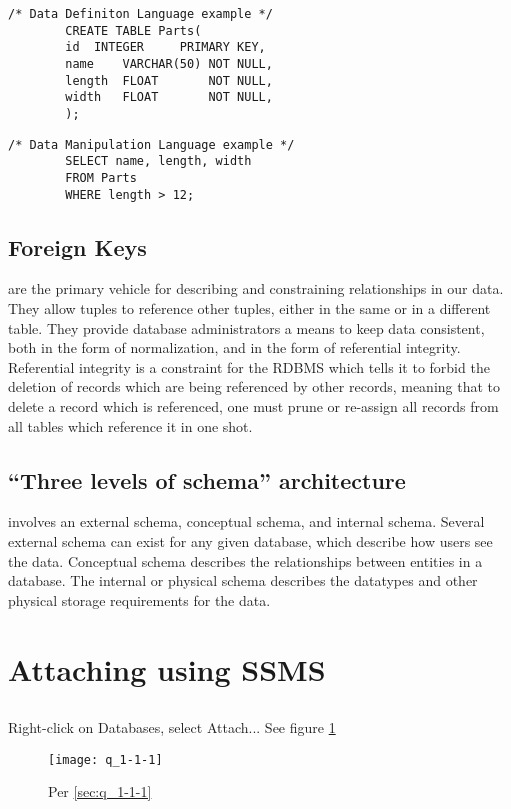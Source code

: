 \documentclass{article}
\begin{document}
		\begin{lstlisting}[float]
		/* Data Definiton Language example */
		CREATE TABLE Parts(
		id	INTEGER     PRIMARY KEY,
		name	VARCHAR(50) NOT NULL,
		length	FLOAT       NOT NULL,
		width	FLOAT       NOT NULL,
		);
		\end{lstlisting}

		\begin{lstlisting}[float]
		/* Data Manipulation Language example */
		SELECT name, length, width
		FROM Parts
		WHERE length > 12;
		\end{lstlisting}

	\subsection{Foreign Keys} are the primary vehicle for describing and
	constraining relationships in our data. They allow tuples to reference
	other tuples, either in the same or in a different table. They provide
	database administrators a means to keep data consistent, both in the
	form of normalization, and in the form of referential integrity.
	Referential integrity is a constraint for the RDBMS which tells it to
	forbid the deletion of records which are being referenced by other
	records, meaning that to delete a record which is referenced, one must
	prune or re-assign all records from all tables which reference it in
	one shot.

	\subsection{``Three levels of schema'' architecture} involves an
	external schema, conceptual schema, and internal schema. Several
	external schema can exist for any given database, which describe how
	users see the data. Conceptual schema describes the relationships
	between entities in a database. The internal or physical schema describes the
	datatypes and other physical storage requirements for the data.

\section{Attaching using SSMS}
\subsection{} Right-click on Databases, select Attach... \label{sec:q_1-1-1}
See figure \ref{fig:q_1-1-1}
\begin{figure}[H]\centering
	\caption{Per \ref{sec:q_1-1-1}}
	\texttt{[image: q\_1-1-1]}
	\label{fig:q_1-1-1}
\end{figure}
\end{document}
